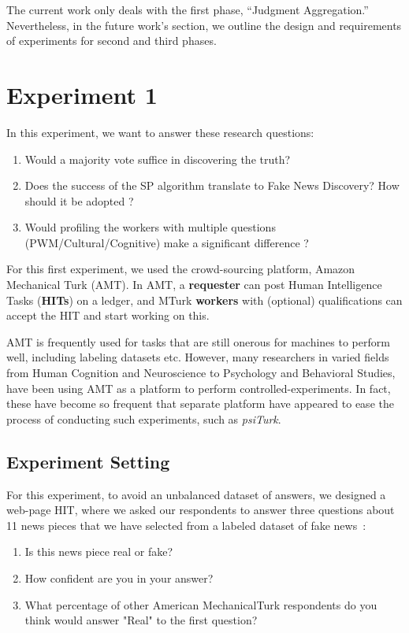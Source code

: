\documentclass{report}
\theoremstyle{definition}
\begin{document}
The current work only deals with the first phase, ``Judgment Aggregation.'' Nevertheless, in the future work's section, we outline the design and requirements of  experiments for second and third phases.

\section{Experiment 1}
In this experiment, we want to answer these research questions:

\begin{enumerate}
    \item Would a majority vote suffice in discovering the truth?
    \item Does the success of the SP algorithm translate to Fake News Discovery? How should it be adopted ?
    \item Would profiling the workers with multiple questions (PWM/Cultural/Cognitive) make a significant difference ?  
\end{enumerate}

For this first experiment, we used the crowd-sourcing platform, Amazon Mechanical Turk (AMT). In AMT, a \textbf{requester} can post Human Intelligence Tasks (\textbf{HITs}) on a ledger, and MTurk \textbf{workers} with (optional) qualifications can accept the HIT and start working on this.

AMT is frequently used for tasks that are still onerous for machines to perform well, including labeling datasets etc. However, many researchers in varied fields from Human Cognition and Neuroscience to Psychology and Behavioral Studies, have been using AMT as a platform to perform controlled-experiments. In fact, these have become so frequent that separate platform have appeared to ease the process of conducting such experiments, such as \textit{psiTurk}.

\subsection{Experiment Setting}
For this experiment, to avoid an unbalanced dataset of answers, we designed a web-page HIT, where we asked our respondents to answer three questions about 11 news pieces that we have selected from a labeled dataset of fake news~\cite{allcott:stanford}:

\begin{enumerate}
    \item Is this news piece real or fake?
    \item How confident are you in your answer?
    \item What percentage of other American MechanicalTurk respondents do you think would answer "Real" to the first question?
\end{enumerate}
\end{document}
